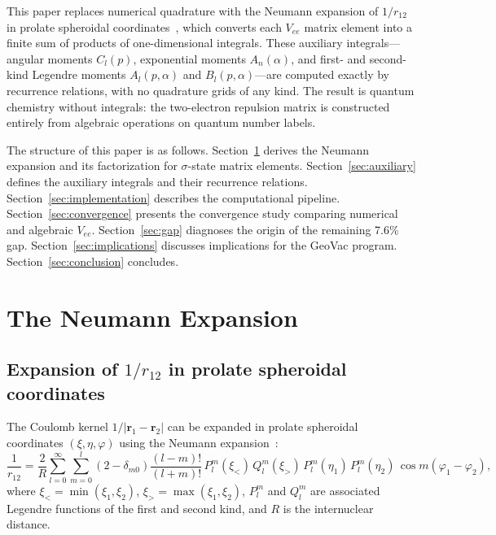 \documentclass[aps,pra,twocolumn,superscriptaddress,longbibliography]{revtex4-2}
\begin{document}
This paper replaces numerical quadrature with the Neumann
expansion of $1/r_{12}$ in prolate spheroidal
coordinates~\cite{Neumann1878, Roothaan1951, Ruedenberg1951},
which converts each $V_{ee}$ matrix element into a finite
sum of products of one-dimensional integrals.  These auxiliary
integrals---angular moments $C_l(p)$, exponential moments
$A_n(\alpha)$, and first- and second-kind Legendre moments
$A_l(p,\alpha)$ and $B_l(p,\alpha)$---are computed exactly by
recurrence relations, with no quadrature grids of any kind.
The result is quantum chemistry without integrals: the
two-electron repulsion matrix is constructed entirely from
algebraic operations on quantum number labels.

The structure of this paper is as follows.
Section~\ref{sec:neumann} derives the Neumann expansion and
its factorization for $\sigma$-state matrix elements.
Section~\ref{sec:auxiliary} defines the auxiliary integrals
and their recurrence relations.
Section~\ref{sec:implementation} describes the computational
pipeline.  Section~\ref{sec:convergence} presents the
convergence study comparing numerical and algebraic $V_{ee}$.
Section~\ref{sec:gap} diagnoses the origin of the remaining
7.6\% gap.  Section~\ref{sec:implications} discusses
implications for the GeoVac program.
Section~\ref{sec:conclusion} concludes.


\section{The Neumann Expansion}
\label{sec:neumann}

\subsection{Expansion of \texorpdfstring{$1/r_{12}$}{1/r12} in
prolate spheroidal coordinates}

The Coulomb kernel $1/|\mathbf{r}_1 - \mathbf{r}_2|$ can be expanded
in prolate spheroidal coordinates $(\xi, \eta, \varphi)$ using the
Neumann expansion~\cite{Neumann1878, Morse1953}:
\begin{equation}
  \frac{1}{r_{12}} = \frac{2}{R}\sum_{l=0}^{\infty}\sum_{m=0}^{l}
    (2-\delta_{m0})\frac{(l-m)!}{(l+m)!}\,
    P_l^m(\xi_<)\,Q_l^m(\xi_>)\,
    P_l^m(\eta_1)\,P_l^m(\eta_2)\,
    \cos m(\varphi_1 - \varphi_2),
  \label{eq:neumann_full}
\end{equation}
where $\xi_< = \min(\xi_1, \xi_2)$, $\xi_> = \max(\xi_1, \xi_2)$,
$P_l^m$ and $Q_l^m$ are associated Legendre functions of the first
and second kind, and $R$ is the internuclear distance.
\end{document}
